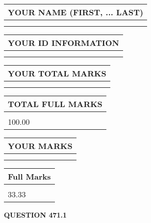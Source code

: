\documentclass{ctexart}
\begin{document}
   
   
   
\newpage 
\setcounter{page}{ 
   471001 } 
   
   
   
   
\noindent\begin{tabular}{|l|}
\hline
YOUR NAME (FIRST, ... LAST)  \\
\hline
 \\ 
 \\ 
\hline
\end{tabular}
\hspace{0.05in} \begin{tabular}{|l|}
\hline
 YOUR   ID   INFORMATION  \\
\hline
 \\ 
 \\ 
\hline
\end{tabular}
   
   
\vspace{0.2in}\noindent\begin{tabular}{|l|}
\hline
YOUR TOTAL MARKS  \\
\hline
 \\ 
 \\ 
\hline
\end{tabular}
\hspace{0.05in} \begin{tabular}{|l|}
\hline
TOTAL FULL MARKS  \\
\hline
 \\ 
100.00 \\
\hline
\end{tabular}
   
   
 \vspace{0.2in}
 
 
 
 
   
   
  
\vspace{0.2in}
  
\noindent\begin{tabular}{|l|}
\hline
 YOUR MARKS  \\
\hline
 \\ 
 \\ 
\hline
\end{tabular}
\hspace{0.05in} \begin{tabular}{|l|}
\hline
 Full Marks  \\
\hline
 \\ 
33.33 \\
\hline
\end{tabular}
{\textbf{\Large{QUESTION
471.1 
}}}
  
\end{document}
